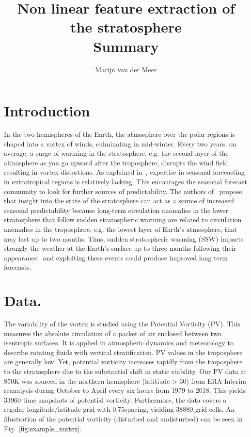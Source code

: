 \documentclass[10pt]{article}
\begin{document}
	
  \renewcommand{\qedsymbol}{\smiley}
	\title{Non linear feature extraction of the stratosphere \\ Summary}
	\author{Marijn van der Meer}
	\maketitle

\section{Introduction}
In the two hemispheres of the Earth, the atmosphere over the polar regions is shaped into a vortex of winds, culminating in mid-winter. Every two years, on average, a surge of warming in the stratosphere, e.g. the second layer of the atmosphere as you go upward after the troposphere,  disrupts the 
wind field resulting in vortex distortions. As explained in~\cite{Sigmond2013}, expertise in seasonal forecasting in extratropical regions is relatively lacking. This encourages the seasonal forecast community to look for further sources of predictability. The authors of~\cite{Sigmond2013} propose that insight into the state of the stratosphere can act as a source of increased seasonal predictability because long-term circulation anomalies in the lower stratosphere that follow sudden stratospheric warming are related to circulation anomalies in the troposphere, e.g. the lowest layer of Earth's atmosphere, that may last up to two months. Thus,  sudden stratospheric warming (SSW) impacts strongly the weather at the Earth's surface up to three months following their appearance~\cite{Baldwin581} and exploiting these events could produce improved long term forecasts. 

\section{Data.}

The variability of the vortex is studied using the Potential Vorticity (PV). This measures the absolute circulation of a packet of air enclosed between two isentropic surfaces. It is applied in atmospheric dynamics and meteorology to describe rotating fluids with vertical stratification. PV values in the troposphere are generally low. Yet, potential vorticity increases rapidly from the troposphere to the stratosphere due to the substantial shift in static stability. 
Our PV data at 850K was sourced in the northern-hemisphere (latitiude > 30\textdegree) from ERA-Interim reanalysis during October to April every six hours from 1979 to 2018. This yields 33960 time snapshots of potential vorticity. Furthermore, the data covers a regular longitude/latitude grid with 0.75\textdegree spacing, yielding 38880 grid cells. An illustration of the potential vorticity (disturbed and undisturbed) can be seen in Fig.~\ref{fig:example_vortex}. \newline
\end{document}
